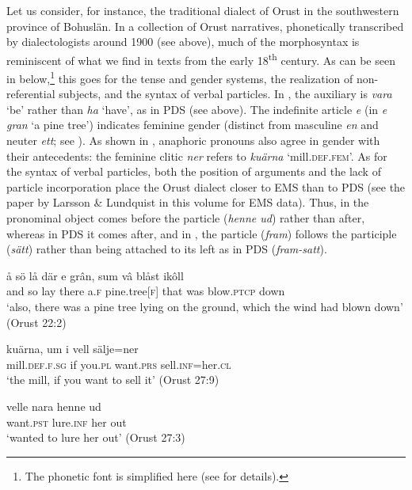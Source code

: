 \documentclass[output=paper]{langscibook}
\begin{document}
Let us consider, for instance, the traditional dialect of Orust in the southwestern province of Bohuslän. In a collection of Orust narratives, phonetically transcribed by dialectologists around 1900 (see  above), much of the morphosyntax is reminiscent of what we find in texts from the early 18\textsuperscript{th} century. As can be seen in  below,\footnote{The phonetic font is simplified here (see \citealt{Petzell2019,Petzell2020} for details).} this goes for the tense and gender systems, the realization of non-referential subjects, and the syntax of verbal particles. In , the auxiliary is \textit{vara} ‘be’ rather than \textit{ha} ‘have’, as in PDS (see  above). The indefinite article \textit{e} (in \textit{e gran} ‘a pine tree’) indicates feminine gender (distinct from masculine \textit{en} and neuter \textit{ett}; see ). As shown in , anaphoric pronouns also agree in gender with their antecedents: the feminine clitic \textit{ner} refers to \textit{kuärna} ‘mill.\textsc{def}.\textsc{fem}’. As for the syntax of verbal particles, both the position of arguments and the lack of particle incorporation place the Orust dialect closer to EMS than to PDS (see the paper by Larsson \& Lundquist in this volume for EMS data). Thus, in  the pronominal object comes before the particle (\textit{henne ud}) rather than after, whereas in PDS it comes after, and in , the particle (\textit{fram}) follows the participle (\textit{sätt}) rather than being attached to its left as in PDS (\textit{fram-satt}).


\ea \label{ex:intro:39}
\ea \label{ex:intro:39a}
\gll å     sö lå   där    e     grân,     sum   vâ   blåst       ikôll\\
      and    so lay     there  a.\textsc{f}  pine.tree[\textsc{f}]    that     was blow\textsc{.ptcp}   down\\
\glt       ‘also, there was a pine tree lying on the ground, which the       wind had blown down’ (Orust 22:2)

\ex \label{ex:intro:39b}
\gll  kuärna,       um   i       vell       sälje=ner\\
    mill\textsc{.def.f.sg}   if     you\textsc{.pl}   want.\textsc{prs}   sell.\textsc{inf}=her.\textsc{cl}\\
\glt `the mill, if you want to sell it’ (Orust 27:9)

\ex \label{ex:intro:39c}
\gll  velle       nara     henne   ud\\
    want.\textsc{pst}   lure.\textsc{inf}  her     out\\
\glt `wanted to lure her out’ (Orust 27:3)
\end{document}
